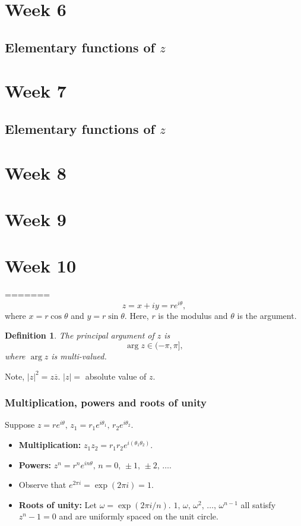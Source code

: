 \documentclass{article}
\newtheorem{definition}{Definition}
\begin{document}
\section{Week 6}
\subsection{Elementary functions of $z$}

\section{Week 7}
\subsection{Elementary functions of $z$}

\section{Week 8}

\section{Week 9}

\section{Week 10}
=======
\begin{equation}
    z = x+iy=re^{i\theta},
\end{equation}
where $x=r\cos\theta$ and $y=r\sin\theta$. Here, $r$ is the modulus and $\theta$ is the argument. 
\begin{definition}
The principal argument of $z$ is
    \begin{equation}
        \arg z\in(-\pi,\pi],
    \end{equation}
    where $\arg z$ is multi-valued.
\end{definition}
Note, $\vert z\vert^2 = z\overline{z}$. $\vert z\vert=$ absolute value of $z$.

\subsubsection{Multiplication, powers and roots of unity}
Suppose $z=re^{i\theta},\,z_1 = r_1e^{i\theta_1},\,r_2e^{i\theta_2}$.
\begin{itemize}
    \item \textbf{Multiplication:} $z_1 z_2 = r_1 r_2 e^{i(\theta_1\theta_2)}$.
    \item \textbf{Powers:} $z^n=r^n e^{in\theta},\,n=0,\,\pm1,\,\pm2,\,\ldots$.
    \item Observe that $e^{2\pi i}=\exp(2\pi i) = 1$.
    \item \textbf{Roots of unity:} Let $\omega = \exp(2\pi i/n)$. $1,\,\omega,\,\omega^2,\,\ldots,\,\omega^{n-1}$ all satisfy $z^n-1=0$ and are uniformly spaced on the unit circle.
\end{itemize}
\end{document}
